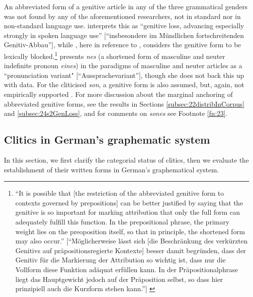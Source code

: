 An abbreviated form of a genitive article in any of the three grammatical genders was not found by any of the aforementioned researchers, not in standard nor in non-standard language use.
\citet[5]{Burri2003} interprets this as ``genitive loss, advancing especially strongly in spoken language use'' [``insbesondere im Mündlichen fortschreitenden Genitiv-Abbau''], while \citet[178]{Vogel2006}, here in reference to \citet[112]{Prinz1991}, considers the genitive form to be lexically blocked.\footnote{
	``It is possible that [the restriction of the abbreviated genitive form to contexts governed by prepositions] can be better justified by saying that the genitive is so important for marking attribution that only the full form can adequately fulfill this function.
	In the prepositional phrase, the primary weight lies on the preoposition itself, so that in principle, the shortened form may also occur.'' [``Möglicherweise lässt sich [die Beschränkung des verkürzten Genitivs auf präpositionsregierte Kontexte] besser damit begründen, dass der Genitiv für die Markierung der Attribution so wichtig ist, dass nur die Vollform diese Funktion adäquat erfüllen kann. In der Präpositionalphrase liegt das Hauptgewicht jedoch auf der Präposition selbst, so dass hier prinzipiell auch die Kurzform stehen kann.''] \citep[178]{Vogel2006}}
\citet[76]{Ziegler2011} presents \textit{nes} (a shortened form of masculine and neuter indefinite pronoun \textit{eines}) in the paradigms of masculine and neuter articles as a ``pronunciation variant" [``Aussprachevariant''], though she does not back this up with data.
For the cliticised \textit{son}, a genitive form is also assumed, but, again, not empirically supported \citep[30]{Heusinger2012}.
For more discussion about the marginal anchoring of abbreviated genitive forms, see the results in Sections \ref{subsec:22distribInCorpus} and \ref{subsec:24s2GenLoss}, and for comments on \textit{sones} see Footnote \ref{fn:23}.

\subsection{Clitics in German's graphematic system}
\label{subsec:13cliticsGraphematics}

In this section, we first clarify the categorial status of clitics, then we evaluate the establishment of their written forms in German's graphematical system.


